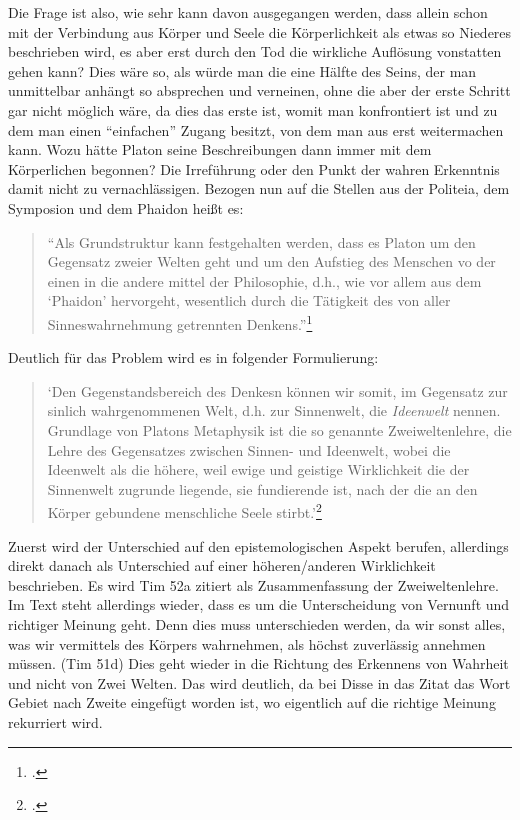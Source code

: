 \documentclass[12pt]{article}
\newcommand*{\zitatblock}[1]{%
    \begin{quote}
    \fontsize{10}{12}\selectfont
    \setlength{\parskip}{1.0em}
    #1
    \end{quote}
}
\begin{document}
Die Frage ist also, wie sehr kann davon ausgegangen werden, dass allein schon mit der Verbindung aus Körper und Seele die Körperlichkeit als etwas so Niederes beschrieben wird, es aber erst durch den Tod die wirkliche Auflösung vonstatten gehen kann? Dies wäre so, als würde man die eine Hälfte des Seins, der man unmittelbar anhängt so absprechen und verneinen, ohne die aber der erste Schritt gar nicht möglich wäre, da dies das erste ist, womit man konfrontiert ist und zu dem man einen \enquote{einfachen} Zugang besitzt, von dem man aus erst weitermachen kann. Wozu hätte Platon seine Beschreibungen dann immer mit dem Körperlichen begonnen? Die Irreführung oder den Punkt der wahren Erkenntnis damit nicht zu vernachlässigen.
Bezogen nun auf die Stellen aus der Politeia, dem Symposion und dem Phaidon heißt es:
\zitatblock{\enquote{Als Grundstruktur kann festgehalten werden, dass es Platon um den Gegensatz zweier Welten geht und um den Aufstieg des Menschen vo der einen in die andere mittel der Philosophie, d.h., wie vor allem aus dem \enquote{Phaidon} hervorgeht, wesentlich durch die Tätigkeit des von aller Sinneswahrnehmung getrennten Denkens.}\footcite[][S. 29]{DisseMetaphysik}}
Deutlich für das Problem wird es in folgender Formulierung: \zitatblock{\enquote*{Den Gegenstandsbereich des Denkesn können wir somit, im Gegensatz zur sinlich wahrgenommenen Welt, d.h. zur Sinnenwelt, die \emph{Ideenwelt} nennen. Grundlage von Platons Metaphysik ist die so genannte Zweiweltenlehre, die Lehre des Gegensatzes zwischen Sinnen- und Ideenwelt, wobei die Ideenwelt als die höhere, weil ewige und geistige Wirklichkeit die der Sinnenwelt zugrunde liegende, sie fundierende ist, nach der die an den Körper gebundene menschliche Seele stirbt.}\footcite[][S. 29]{DisseMetaphysik}} Zuerst wird der Unterschied auf den epistemologischen Aspekt berufen, allerdings direkt danach als Unterschied auf einer höheren/anderen Wirklichkeit beschrieben.
Es wird Tim 52a zitiert als Zusammenfassung der Zweiweltenlehre. Im Text steht allerdings wieder, dass es um die Unterscheidung von Vernunft und richtiger Meinung geht. Denn dies muss unterschieden werden, da wir sonst alles, was wir vermittels des Körpers wahrnehmen, als höchst zuverlässig annehmen müssen. (Tim 51d) Dies geht wieder in die Richtung des Erkennens von Wahrheit und nicht von Zwei Welten. Das wird deutlich, da bei Disse in das Zitat das Wort Gebiet nach Zweite eingefügt worden ist, wo eigentlich auf die richtige Meinung rekurriert wird.
\end{document}

